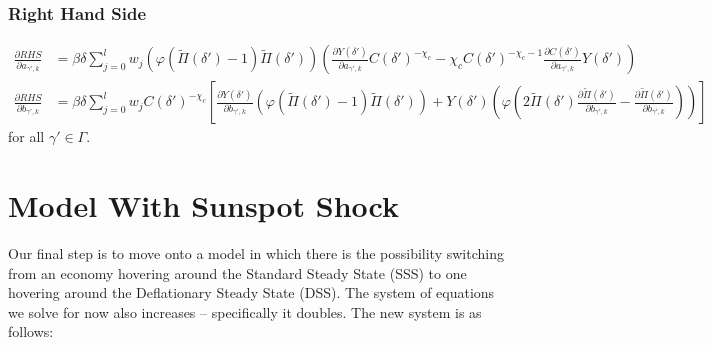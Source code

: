 \documentclass[11pt]{article}
\begin{document}
\subsubsection*{Right Hand Side}
\begin{align}
\frac{\partial RHS}{\partial a_{\gamma',k}} &= \beta\delta\sum_{j = 0}^{l}w_j\left(\varphi(\tilde{\Pi}(\delta') - 1)\tilde{\Pi}(\delta')\right)\left(\frac{\partial Y(\delta')}{\partial a_{\gamma',k}}C(\delta')^{-\chi_c} - \chi_cC(\delta')^{-\chi_c - 1}\frac{\partial C(\delta')}{\partial a_{\gamma',k}}Y(\delta')\right) \\
\frac{\partial RHS}{\partial b_{\gamma',k}} &=  \beta\delta\sum_{j = 0}^{l}w_jC(\delta')^{-\chi_c}\left[\frac{\partial Y(\delta')}{\partial b_{\gamma',k}}\left(\varphi(\tilde{\Pi}(\delta') - 1)\tilde{\Pi}(\delta')\right) + Y(\delta')\left(\varphi\left(2\tilde{\Pi}(\delta')\frac{\partial \tilde{\Pi}(\delta')}{\partial b_{\gamma',k}} - \frac{\partial \tilde{\Pi}(\delta')}{\partial b_{\gamma',k}}\right)\right)\right] 
\end{align}
for all $\gamma'\in\Gamma$.
\section{Model With Sunspot Shock}
Our final step is to move onto a model in which there is the possibility switching from an economy hovering around the Standard Steady State (SSS) to one hovering around the Deflationary Steady State (DSS). The system of equations we solve for now also increases -- specifically it doubles. The new system is as follows: 
\end{document}
